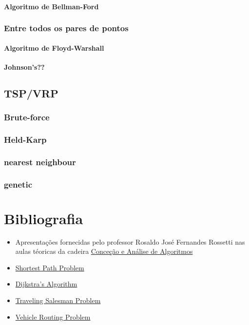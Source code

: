 \documentclass[article, a4paper, 12pt, oneside]{memoir}
\begin{document}
\subsubsection{Algoritmo de Bellman-Ford}

\subsection{Entre todos os pares de pontos}

\subsubsection{Algoritmo de Floyd-Warshall}

\subsubsection{Johnson's??}

\section{TSP/VRP}

\subsection{Brute-force}

\subsection{Held-Karp}

\subsection{nearest neighbour}

\subsection{genetic}

\newpage
\chapter{Bibliografia}
\begin{itemize}
	\item Apresentações fornecidas pelo professor Rosaldo José Fernandes Rossetti nas aulas téoricas da cadeira \href{https://sigarra.up.pt/feup/pt/ucurr_geral.ficha_uc_view?pv_ocorrencia_id=436441}{Conceção e Análise de Algoritmos}
	\item \href{https://en.wikipedia.org/wiki/Shortest_path_problem}{Shortest Path Problem}
	\item \href{https://en.wikipedia.org/wiki/Dijkstra\%27s_algorithm}{Dijkstra's Algorithm}
	\item \href{https://en.wikipedia.org/wiki/Travelling_salesman_problem}{Traveling Salesman Problem}
	\item \href{https://en.wikipedia.org/wiki/Vehicle_routing_problem}{Vehicle Routing Problem}
\end{itemize}
\end{document}

